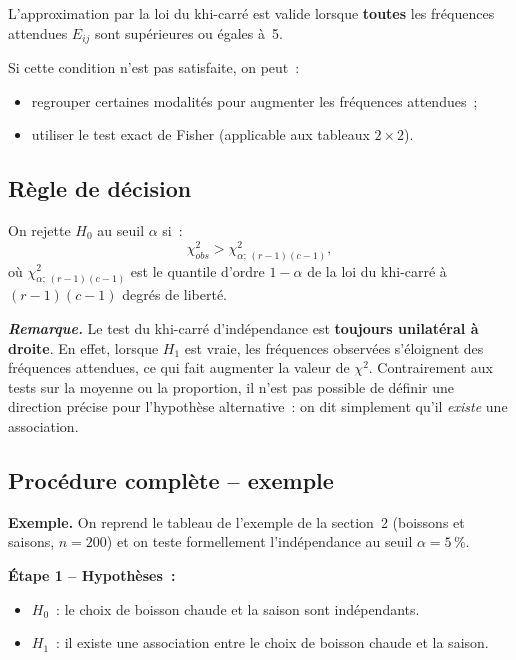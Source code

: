 \documentclass[11pt,french]{article}
\newcommand{\remarque}[1]{\medskip\noindent\textit{\textbf{Remarque.}} #1\medskip}
\begin{document}
L'approximation par la loi du khi-carré est valide lorsque \textbf{toutes} les fréquences
attendues $E_{ij}$ sont supérieures ou égales à~5.

Si cette condition n'est pas satisfaite, on peut~:
\begin{itemize}[itemsep=2pt]
  \item regrouper certaines modalités pour augmenter les fréquences attendues~;
  \item utiliser le test exact de Fisher (applicable aux tableaux $2 \times 2$).
\end{itemize}

\subsection{Règle de décision}

On rejette $H_0$ au seuil $\alpha$ si~:
\[
  \chi^2_{obs} > \chi^2_{\alpha;\,(r-1)(c-1)},
\]
où $\chi^2_{\alpha;\,(r-1)(c-1)}$ est le quantile d'ordre $1-\alpha$ de la loi du khi-carré
à $(r-1)(c-1)$ degrés de liberté.

\remarque{Le test du khi-carré d'indépendance est \textbf{toujours unilatéral à droite}. En
effet, lorsque $H_1$ est vraie, les fréquences observées s'éloignent des fréquences attendues,
ce qui fait augmenter la valeur de $\chi^2$. Contrairement aux tests sur la moyenne ou la
proportion, il n'est pas possible de définir une direction précise pour l'hypothèse
alternative~: on dit simplement qu'il \emph{existe} une association.}

\subsection{Procédure complète -- exemple}

\textbf{Exemple.} On reprend le tableau de l'exemple de la section~2 (boissons et saisons,
$n = 200$) et on teste formellement l'indépendance au seuil $\alpha = 5\,\%$.

\medskip
\textbf{Étape 1 -- Hypothèses~:}
\begin{itemize}[itemsep=2pt]
  \item $H_0$~: le choix de boisson chaude et la saison sont indépendants.
  \item $H_1$~: il existe une association entre le choix de boisson chaude et la saison.
\end{itemize}
\end{document}
